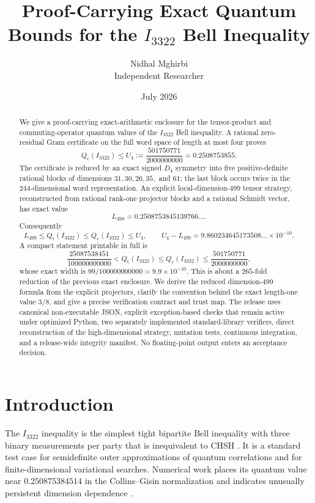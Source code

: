 \documentclass[11pt]{article}
\title{\textbf{Proof-Carrying Exact Quantum Bounds for the $I_{3322}$ Bell Inequality}}
\author{Nidhal Mghirbi\\Independent Researcher}
\date{July 2026}
\newcommand{\1}{\mathbb{1}}
\newcommand{\Qt}{Q_{\mathrm t}}
\newcommand{\Qc}{Q_{\mathrm c}}
\begin{document}
\maketitle

\begin{abstract}
We give a proof-carrying exact-arithmetic enclosure for the tensor-product and commuting-operator quantum values of the $I_{3322}$ Bell inequality.  A rational zero-residual Gram certificate on the full word space of length at most four proves
\[
\Qc(I_{3322})\le U_4:=\frac{501750771}{2000000000}=0.2508753855.
\]
The certificate is reduced by an exact signed $D_4$ symmetry into five positive-definite rational blocks of dimensions $31,30,26,35,$ and $61$; the last block occurs twice in the $244$-dimensional word representation.  An explicit local-dimension-$499$ tensor strategy, reconstructed from rational rank-one projector blocks and a rational Schmidt vector, has exact value
\[
L_{499}=0.2508753845139766\ldots .
\]
Consequently
\[
L_{499}\le \Qt(I_{3322})\le \Qc(I_{3322})\le U_4,
\qquad U_4-L_{499}=9.860234645173508\ldots\times10^{-10}.
\]
A compact statement printable in full is
\[
\frac{25087538451}{100000000000}<\Qt(I_{3322})\le\Qc(I_{3322})\le
\frac{501750771}{2000000000},
\]
whose exact width is $99/100000000000=9.9\times10^{-10}$.  This is about a $265$-fold reduction of the previous exact enclosure.  We derive the reduced dimension-$499$ formula from the explicit projectors, clarify the convention behind the exact length-one value $3/8$, and give a precise verification contract and trust map.  The release uses canonical non-executable JSON, explicit exception-based checks that remain active under optimized Python, two separately implemented standard-library verifiers, direct reconstruction of the high-dimensional strategy, mutation tests, continuous integration, and a release-wide integrity manifest.  No floating-point output enters an acceptance decision.
\end{abstract}

\section{Introduction}
The $I_{3322}$ inequality is the simplest tight bipartite Bell inequality with three binary measurements per party that is inequivalent to CHSH \cite{CollinsGisin2004}.  It is a standard test case for semidefinite outer approximations of quantum correlations and for finite-dimensional variational searches.  Numerical work places its quantum value near $0.250875384514$ in the Collins--Gisin normalization and indicates unusually persistent dimension dependence \cite{NPA2008,PalVertesi2010,Tavakoli2023}.
\end{document}
